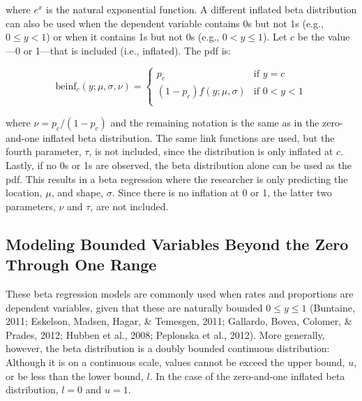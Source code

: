 \documentclass[english,man]{apa6}
\theoremstyle{definition}
\theoremstyle{definition}
\theoremstyle{remark}
\begin{document}
where \(e^x\) is the natural exponential function. A different inflated
beta distribution can also be used when the dependent variable contains
0s but not 1s (e.g., \(0 \leq y < 1\)) or when it contains 1s but not 0s
(e.g., \(0 < y \leq 1\)). Let \(c\) be the value---0 or 1---that is
included (i.e., inflated). The pdf is:

\begin{center}
\[
\text{beinf}_c(y;\mu,\sigma,\nu) =
\begin{cases}
  p_c                             & \text{if } y = c\\
  (1 - p_c)f(y;\mu,\sigma)        & \text{if } 0 < y < 1\\
\end{cases}
\]
\end{center}

where \(\nu = p_c / (1 - p_c)\) and the remaining notation is the same
as in the zero-and-one inflated beta distribution. The same link
functions are used, but the fourth parameter, \(\tau\), is not included,
since the distribution is only inflated at \(c\). Lastly, if no 0s or 1s
are observed, the beta distribution alone can be used as the pdf. This
results in a beta regression where the researcher is only predicting the
location, \(\mu\), and shape, \(\sigma\). Since there is no inflation at
0 or 1, the latter two parameters, \(\nu\) and \(\tau\), are not
included.

\subsection{Modeling Bounded Variables Beyond the Zero Through One
Range}\label{modeling-bounded-variables-beyond-the-zero-through-one-range}

These beta regression models are commonly used when rates and
proportions are dependent variables, given that these are naturally
bounded \(0 \leq y \leq 1\) (Buntaine, 2011; Eskelson, Madsen, Hagar, \&
Temesgen, 2011; Gallardo, Bovea, Colomer, \& Prades, 2012; Hubben et
al., 2008; Peplonska et al., 2012). More generally, however, the beta
distribution is a doubly bounded continuous distribution: Although it is
on a continuous scale, values cannot be exceed the upper bound, \(u\),
or be less than the lower bound, \(l\). In the case of the zero-and-one
inflated beta distribution, \(l = 0\) and \(u = 1\).
\end{document}

